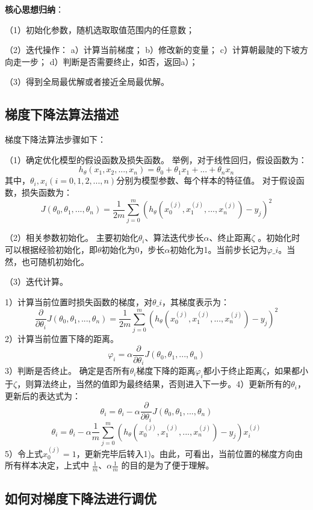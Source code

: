 \textbf{核心思想归纳}：

（1）初始化参数，随机选取取值范围内的任意数；

（2）迭代操作： a）计算当前梯度； b）修改新的变量；
c）计算朝最陡的下坡方向走一步； d）判断是否需要终止，如否，返回a）；

（3）得到全局最优解或者接近全局最优解。

\subsection{梯度下降法算法描述}\label{ux68afux5ea6ux4e0bux964dux6cd5ux7b97ux6cd5ux63cfux8ff0}

梯度下降法算法步骤如下：

（1）确定优化模型的假设函数及损失函数。 ​
举例，对于线性回归，假设函数为： \[
  h_\theta(x_1,x_2,...,x_n)=\theta_0+\theta_1x_1+...+\theta_nx_n
\]
其中，$\theta_i,x_i(i=0,1,2,...,n)$分别为模型参数、每个样本的特征值。
对于假设函数，损失函数为： \[
  J(\theta_0,\theta_1,...,\theta_n)=\frac{1}{2m}\sum^{m}_{j=0}(h_\theta (x^{(j)}_0
    ,x^{(j)}_1,...,x^{(j)}_n)-y_j)^2
\]

（2）相关参数初始化。 ​
主要初始化${\theta}_i$、算法迭代步长${\alpha}$、终止距离${\zeta}$ 。初始化时可以根据经验初始化，即${\theta}
$初始化为0，步长${\alpha} $初始化为1。当前步长记为${\varphi}\_i
$。当然，也可随机初始化。

（3）迭代计算。

​ 1）计算当前位置时损失函数的梯度，对${\theta}\_i $，其梯度表示为：
\[
\frac{\partial}{\partial \theta_i}J({\theta}_0,{\theta}_1,...,{\theta}_n)=\frac{1}{2m}\sum^{m}_{j=0}(h_\theta (x^{(j)}_0
    ,x^{(j)}_1,...,x^{(j)}_n)-y_j)^2
\] ​ 2）计算当前位置下降的距离。 \[
{\varphi}_i={\alpha} \frac{\partial}{\partial \theta_i}J({\theta}_0,{\theta}_1,...,{\theta}_n)
\] ​ 3）判断是否终止。 ​
确定是否所有${\theta}_i$梯度下降的距离${\varphi}_i$都小于终止距离${\zeta}$，如果都小于${\zeta}$，则算法终止，当然的值即为最终结果，否则进入下一步。
​ 4）更新所有的${\theta}_i$，更新后的表达式为： \[
{\theta}_i={\theta}_i-\alpha \frac{\partial}{\partial \theta_i}J({\theta}_0,{\theta}_1,...,{\theta}_n)
\] \[
\theta_i=\theta_i - \alpha \frac{1}{m} \sum^{m}_{j=0}(h_\theta (x^{(j)}_0
    ,x^{(j)}_1,...,x^{(j)}_n)-y_j)x^{(j)}_i
\] ​ 5）令上式$x^{(j)}_0=1$，更新完毕后转入1)。 ​
由此，可看出，当前位置的梯度方向由所有样本决定，上式中
$\frac{1}{m}​$、$\alpha \frac{1}{m}​$ 的目的是为了便于理解。

\subsection{如何对梯度下降法进行调优}\label{ux5982ux4f55ux5bf9ux68afux5ea6ux4e0bux964dux6cd5ux8fdbux884cux8c03ux4f18}

